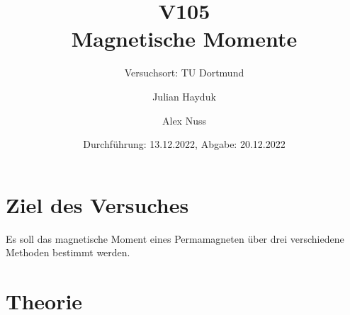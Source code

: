 \documentclass[
  bibliography=totoc,     %
  captions=tableheading,  %
  titlepage=firstiscover, %
]{scrartcl}
\begin{document}
  \setlength{\parindent}{0em} %
  \pagestyle{scrheadings}
  \clearpairofpagestyles
  \ofoot{\pagemark}

  \title{V105 \\Magnetische Momente}
  \author{Julian Hayduk \and Alex Nuss}
  \date{Durchführung: 13.12.2022, Abgabe: 20.12.2022}
  \subtitle{Versuchsort: TU Dortmund }
  \maketitle

  \thispagestyle{empty}
  \newpage
  
  \tableofcontents
  \thispagestyle{empty}
  \setcounter{page}{1}
  
  \newpage
  \section{Ziel des Versuches}
  Es soll das magnetische Moment eines Permamagneten über drei verschiedene Methoden bestimmt werden. 
  
  \section{Theorie}
  
\end{document}

